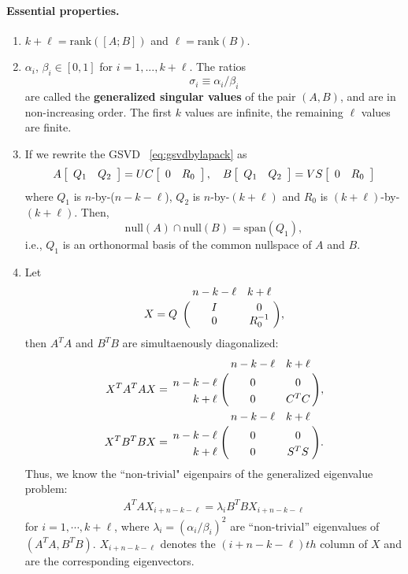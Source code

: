 \paragraph{Essential properties.} \label{properties}
\begin{enumerate}
\item $k+\ell = \mbox{rank}([A; B])$ and $\ell = \mbox{rank}(B)$.

\item 
$\alpha_i$, $\beta_i \in [0, 1]$ for $i = 1,..., k+\ell$. The ratios 
\begin{equation} \label{eq:gsvdef}  
\sigma_i \equiv \alpha_i/\beta_i
\end{equation} 
are called the 
\textbf{generalized singular values} of the pair $(A, B)$, 
and are in non-increasing order. 
The first $k$ values are infinite, 
the remaining $\ell$ values are finite.
         
\item If we rewrite the GSVD ~\eqref{eq:gsvdbylapack} as 
\begin{align}
A\left[ \begin{array}{cc} Q_1 & Q_2 \end{array} \right] = UC\left[ \begin{array}{cc} 0 & R_0 \end{array} \right], \quad 
B\left[ \begin{array}{cc} Q_1 & Q_2 \end{array} \right] = VS\left[ \begin{array}{cc} 0 & R_0 \end{array} \right]
\end{align}
where $Q_1$ is $n$-by-($n-k-\ell$), $Q_2$ is $n$-by-$(k+\ell)$ 
and $R_0$ is $(k+\ell)$-by-$(k+\ell)$. Then, 
\[
\mbox{null}(A)\cap \mbox{null}(B) = \mbox{span}(Q_1),
\] 
i.e., $Q_1$ is an orthonormal basis 
of the common nullspace of $A$ and $B$.
         
\item Let 
$$
X = Q\bordermatrix{ & n-k-\ell & k+\ell   \cr
                                    \hfill & I & 0 \cr
                                    \hfill & 0 & R_0^{-1} },
$$ 
then $A^TA$ and $B^TB$ are simultaenously diagonalized: 
\begin{subequations} \label{eq:simuldiag} 
\begin{align} 
X^TA^TAX & = \bordermatrix{ & n-k-\ell & k+\ell   \cr
                \hfill n-k-\ell & 0 & 0 \cr
                \hfill k+\ell & 0 & C^TC}, \label{eq:simuldiag1} \\ 
X^TB^TBX & = \bordermatrix{ & n-k-\ell & k+\ell   \cr
                \hfill n-k-\ell & 0 & 0 \cr
                \hfill k+\ell & 0 & S^TS}. \label{eq:simuldiag2} 
\end{align} 
\end{subequations} 
Thus, we know the ``non-trivial" eigenpairs of the generalized eigenvalue 
problem:
\begin{align*}
A^TAX_{i+n-k-\ell} = \lambda_{i} B^TBX_{i+n-k-\ell}
\end{align*}
for $i = 1, \cdots, k+\ell$, 
where $\lambda_i = (\alpha_i/\beta_i)^2$ 
are ``non-trivial'' eigenvalues of $(A^TA, B^TB)$. 
$X_{i+n-k-\ell}$ denotes the $(i+n-k-\ell)th$ column of $X$ 
and are the corresponding eigenvectors.
            

\end{enumerate}
